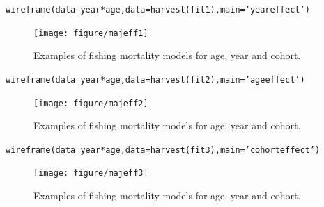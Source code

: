 \documentclass[a4paper,english,10pt]{article}\usepackage[]{graphicx}\usepackage[]{color}
\makeatletter
\newcommand{\hlstr}[1]{\textcolor[rgb]{0.2,0.2,0.2}{#1}}%
\newcommand{\hlopt}[1]{\textcolor[rgb]{0.2,0.2,0.2}{#1}}%
\newcommand{\hlstd}[1]{\textcolor[rgb]{0,0,0}{#1}}%
\newcommand{\hlkwc}[1]{\textcolor[rgb]{0.361,0.506,0.596}{#1}}%
\newcommand{\hlkwd}[1]{\textcolor[rgb]{0.361,0.506,0.596}{#1}}%
\newenvironment{kframe}{%
 \def\at@end@of@kframe{}%
 \ifinner\ifhmode%
  \def\at@end@of@kframe{\end{minipage}}%
  \begin{minipage}{\columnwidth}%
 \fi\fi%
 \def\FrameCommand##1{\hskip\@totalleftmargin \hskip-\fboxsep
 \colorbox{shadecolor}{##1}\hskip-\fboxsep
     \hskip-\linewidth \hskip-\@totalleftmargin \hskip\columnwidth}%
 \MakeFramed {\advance\hsize-\width
   \@totalleftmargin\z@ \linewidth\hsize
   \@setminipage}}%
 {\par\unskip\endMakeFramed%
 \at@end@of@kframe}
\newenvironment{knitrout}{}{} %
\makeatother
\begin{document}
\begin{knitrout}
\color{fgcolor}\begin{kframe}
\begin{alltt}
\hlkwd{wireframe}\hlstd{(data}\hlopt{~}\hlstd{year}\hlopt{*}\hlstd{age,} \hlkwc{data}\hlstd{=}\hlkwd{harvest}\hlstd{(fit1),} \hlkwc{main}\hlstd{=}\hlstr{'year effect'}\hlstd{)}
\end{alltt}
\end{kframe}\begin{figure}[H]


{\centering \texttt{[image: figure/majeff1]} 

}

\caption[Examples of fishing mortality models for age, year and cohort]{Examples of fishing mortality models for age, year and cohort.\label{fig:majeff1}}
\end{figure}

\begin{kframe}\begin{alltt}
\hlkwd{wireframe}\hlstd{(data}\hlopt{~}\hlstd{year}\hlopt{*}\hlstd{age,} \hlkwc{data}\hlstd{=}\hlkwd{harvest}\hlstd{(fit2),} \hlkwc{main}\hlstd{=}\hlstr{'age effect'}\hlstd{)}
\end{alltt}
\end{kframe}\begin{figure}[H]


{\centering \texttt{[image: figure/majeff2]} 

}

\caption[Examples of fishing mortality models for age, year and cohort]{Examples of fishing mortality models for age, year and cohort.\label{fig:majeff2}}
\end{figure}

\begin{kframe}\begin{alltt}
\hlkwd{wireframe}\hlstd{(data}\hlopt{~}\hlstd{year}\hlopt{*}\hlstd{age,} \hlkwc{data}\hlstd{=}\hlkwd{harvest}\hlstd{(fit3),} \hlkwc{main}\hlstd{=}\hlstr{'cohort effect'}\hlstd{)}
\end{alltt}
\end{kframe}\begin{figure}[H]


{\centering \texttt{[image: figure/majeff3]} 

}

\caption[Examples of fishing mortality models for age, year and cohort]{Examples of fishing mortality models for age, year and cohort.\label{fig:majeff3}}
\end{figure}


\end{knitrout}
\end{document}
